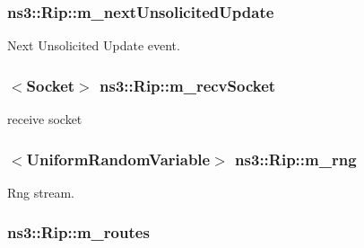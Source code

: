 \subsubsection[{\texorpdfstring{m\+\_\+next\+Unsolicited\+Update}{m_nextUnsolicitedUpdate}}]{ ns3\+::\+Rip\+::m\+\_\+next\+Unsolicited\+Update\hspace{0.3cm}{\ttfamily [private]}}\hypertarget{classns3_1_1Rip_a52794ab079ab76322bedc46a8ea99d0a}{}\label{classns3_1_1Rip_a52794ab079ab76322bedc46a8ea99d0a}


Next Unsolicited Update event. 

\subsubsection[{\texorpdfstring{m\+\_\+recv\+Socket}{m_recvSocket}}]{$<${\bf Socket}$>$ ns3\+::\+Rip\+::m\+\_\+recv\+Socket\hspace{0.3cm}{\ttfamily [private]}}\hypertarget{classns3_1_1Rip_a6c5dc1b74475e3caa0782f37b722be6b}{}\label{classns3_1_1Rip_a6c5dc1b74475e3caa0782f37b722be6b}


receive socket 

\subsubsection[{\texorpdfstring{m\+\_\+rng}{m_rng}}]{$<${\bf Uniform\+Random\+Variable}$>$ ns3\+::\+Rip\+::m\+\_\+rng\hspace{0.3cm}{\ttfamily [private]}}\hypertarget{classns3_1_1Rip_aff68d9a9e912bc0a99201bee4d93e636}{}\label{classns3_1_1Rip_aff68d9a9e912bc0a99201bee4d93e636}


Rng stream. 

\subsubsection[{\texorpdfstring{m\+\_\+routes}{m_routes}}]{ ns3\+::\+Rip\+::m\+\_\+routes\hspace{0.3cm}{\ttfamily [private]}}\hypertarget{classns3_1_1Rip_aea6c918ae311cd88fb2bfb714d6f9c30}{}\label{classns3_1_1Rip_aea6c918ae311cd88fb2bfb714d6f9c30}


